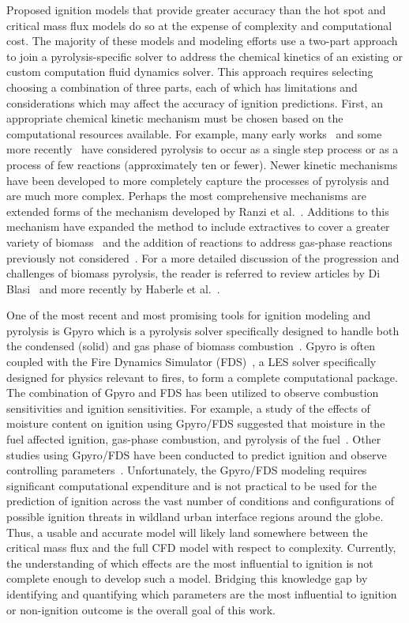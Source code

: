     Proposed ignition models that provide greater accuracy than the hot spot and critical mass flux models do so at the expense of complexity and computational cost. The majority of these models and modeling efforts use a two-part approach to join a pyrolysis-specific solver to address the chemical kinetics of an existing or custom computation fluid dynamics solver. This approach requires selecting choosing a combination of three parts, each of which has limitations and considerations which may affect the accuracy of ignition predictions. First, an appropriate chemical kinetic mechanism must be chosen based on the computational resources available. For example, many early works~\cite{DiBlasi1996} and some more recently~\cite{Ding2015, Torero2020} have considered pyrolysis to occur as a single step process or as a process of few reactions (approximately ten or fewer). Newer kinetic mechanisms have been developed to more completely capture the processes of pyrolysis and are much more complex. Perhaps the most comprehensive mechanisms are extended forms of the mechanism developed by Ranzi et al.~\cite{Ranzi2008}. Additions to this mechanism have expanded the method to include extractives to cover a greater variety of biomass~\cite{Debiagi2015} and the addition of reactions to address gas-phase reactions previously not considered~\cite{Dhahak2019}. For a more detailed discussion of the progression and challenges of biomass pyrolysis, the reader is referred to review articles by Di Blasi~\cite{DIBLASI199371} and more recently by Haberle et al.~\cite{Haberle2017}. 
    
    One of the most recent and most promising tools for ignition modeling and pyrolysis is Gpyro which is a pyrolysis solver specifically designed to handle both the condensed (solid) and gas phase of biomass combustion~\cite{Lautenberger2009a}. Gpyro is often coupled with the Fire Dynamics Simulator (FDS)~\cite{FDSManual}, a LES solver specifically designed for physics relevant to fires, to form a complete computational package. The combination of Gpyro and FDS has been utilized to observe combustion sensitivities and ignition sensitivities. For example, a study of the effects of moisture content on ignition using Gpyro/FDS suggested that moisture in the fuel affected ignition, gas-phase combustion, and pyrolysis of the fuel~\cite{Yashwanth2016}. Other studies using Gpyro/FDS have been conducted to predict ignition and observe controlling parameters~\cite{Shotorban2018, Fernandez-Pello2015, Lautenberger2009}. Unfortunately, the Gpyro/FDS modeling requires significant computational expenditure and is not practical to be used for the prediction of ignition across the vast number of conditions and configurations of possible ignition threats in wildland urban interface regions around the globe. Thus, a usable and accurate model will likely land somewhere between the critical mass flux and the full CFD model with respect to complexity. Currently, the understanding of which effects are the most influential to ignition is not complete enough to develop such a model. Bridging this knowledge gap by identifying and quantifying which parameters are the most influential to ignition or non-ignition outcome is the overall goal of this work. 


